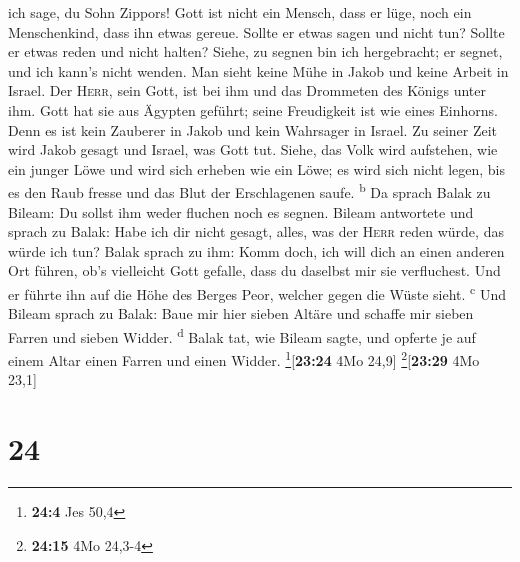 ich sage, du Sohn Zippors!  Gott ist nicht ein Mensch,
dass er lüge, noch ein Menschenkind, dass ihn etwas gereue. Sollte er
etwas sagen und nicht tun? Sollte er etwas reden und nicht halten?
 Siehe, zu segnen bin ich hergebracht; er segnet, und ich
kann's nicht wenden.  Man sieht keine Mühe in Jakob und
keine Arbeit in Israel. Der \textsc{Herr}, sein Gott, ist bei ihm und
das Drommeten des Königs unter ihm.  Gott hat sie aus
Ägypten geführt; seine Freudigkeit ist wie eines Einhorns.
 Denn es ist kein Zauberer in Jakob und kein Wahrsager in
Israel. Zu seiner Zeit wird Jakob gesagt und Israel, was Gott tut.
 Siehe, das Volk wird aufstehen, wie ein junger Löwe und
wird sich erheben wie ein Löwe; es wird sich nicht legen, bis es den
Raub fresse und das Blut der Erschlagenen saufe. \textsuperscript{b}
 Da sprach Balak zu Bileam: Du sollst ihm weder fluchen
noch es segnen.  Bileam antwortete und sprach zu Balak:
Habe ich dir nicht gesagt, alles, was der \textsc{Herr} reden würde, das
würde ich tun?  Balak sprach zu ihm: Komm doch, ich will
dich an einen anderen Ort führen, ob's vielleicht Gott gefalle, dass du
daselbst mir sie verfluchest.  Und er führte ihn auf die
Höhe des Berges Peor, welcher gegen die Wüste sieht. \textsuperscript{c}
 Und Bileam sprach zu Balak: Baue mir hier sieben Altäre
und schaffe mir sieben Farren und sieben Widder. \textsuperscript{d}
 Balak tat, wie Bileam sagte, und opferte je auf einem
Altar einen Farren und einen Widder. \footnote{\textbf{24:4} Jes 50,4}{[}\textbf{23:24}
4Mo 24,9{]} \footnote{\textbf{24:15} 4Mo 24,3-4}{[}\textbf{23:29} 4Mo
23,1{]}

\hypertarget{section-23}{%
\section{24}\label{section-23}}

